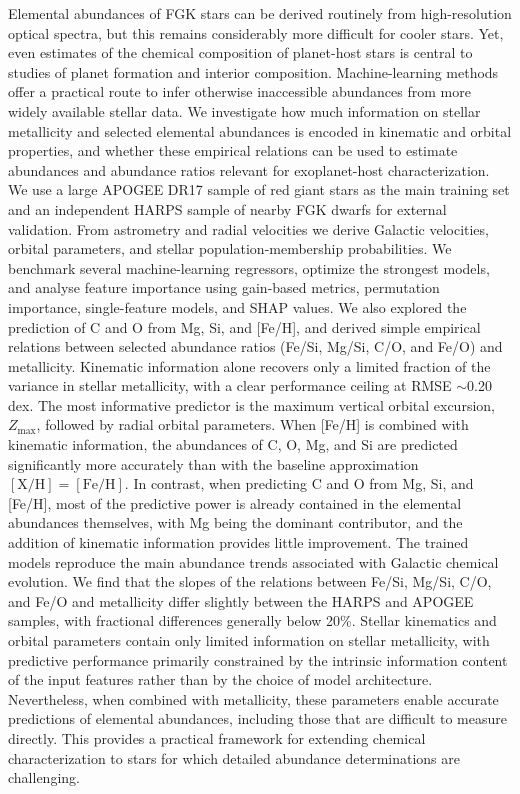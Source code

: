 \documentclass{aa}
\begin{document}
  \abstract
   {Elemental abundances of FGK stars can be derived routinely from high-resolution optical spectra, but this remains considerably more difficult for cooler stars. Yet, even estimates of the chemical composition of planet-host stars is central to studies of planet formation and interior composition. Machine-learning methods offer a practical route to infer otherwise inaccessible abundances from more widely available stellar data.}
   {We investigate how much information on stellar metallicity and selected elemental abundances is encoded in kinematic and orbital properties, and whether these empirical relations can be used to estimate abundances and abundance ratios relevant for exoplanet-host characterization.} 
   {We use a large APOGEE DR17 sample of red giant stars as the main training set and an independent HARPS sample of nearby FGK dwarfs for external validation. From astrometry and radial velocities we derive Galactic velocities, orbital parameters, and stellar population-membership probabilities. We benchmark several machine-learning regressors, optimize the strongest models, and analyse feature importance using gain-based metrics, permutation importance, single-feature models, and SHAP values. We also explored the prediction of C and O from Mg, Si, and [Fe/H], and derived simple empirical relations between selected abundance ratios (Fe/Si, Mg/Si, C/O, and Fe/O) and metallicity.}
   {Kinematic information alone recovers only a limited fraction of the variance in stellar metallicity, with a clear performance ceiling at RMSE $\sim$0.20 dex. The most informative predictor is the maximum vertical orbital excursion, $Z_{\max}$, followed by radial orbital parameters. When [Fe/H] is combined with kinematic information, the abundances of C, O, Mg, and Si are predicted significantly more accurately than with the baseline approximation $\mathrm{[X/H]}=\mathrm{[Fe/H]}$. In contrast, when predicting C and O from Mg, Si, and [Fe/H], most of the predictive power is already contained in the elemental abundances themselves, with Mg being the dominant contributor, and the addition of kinematic information provides little improvement. The trained models reproduce the main abundance trends associated with Galactic chemical evolution. We find that the slopes of the relations between Fe/Si, Mg/Si, C/O, and Fe/O and metallicity differ slightly between the HARPS and APOGEE samples, with fractional differences generally below 20\%.}
   {Stellar kinematics and orbital parameters contain only limited information on stellar metallicity, with predictive performance primarily constrained by the intrinsic information content of the input features rather than by the choice of model architecture. Nevertheless, when combined with metallicity, these parameters enable accurate predictions of elemental abundances, including those that are difficult to measure directly. This provides a practical framework for extending chemical characterization to stars for which detailed abundance determinations are challenging.}
\end{document}
